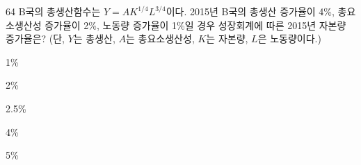 \begin{question}{64}
B국의 총생산함수는 $Y = AK^{1/4}L^{3/4}$이다. 2015년 B국의 총생산 증가율이 4\%, 총요소생산성 증가율이 2\%, 노동량 증가율이 1\%일 경우 성장회계에 따른 2015년 자본량 증가율은? (단, $Y$는 총생산, $A$는 총요소생산성, $K$는 자본량, $L$은 노동량이다.)
\begin{choices}
  \item 1\%
  \item 2\%
  \item 2.5\%
  \item 4\%
  \item 5\%
\end{choices}
\end{question}
